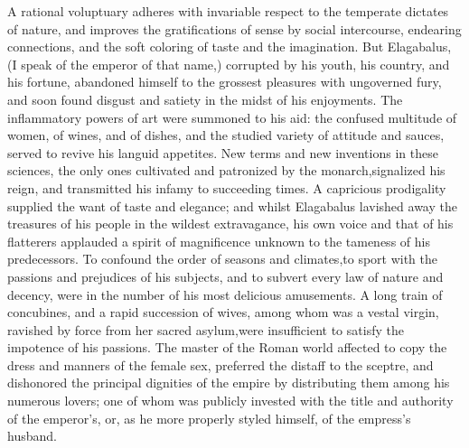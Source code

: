A rational voluptuary adheres with invariable respect to the
temperate dictates of nature, and improves the gratifications of
sense by social intercourse, endearing connections, and the soft
coloring of taste and the imagination. But Elagabalus, (I speak
of the emperor of that name,) corrupted by his youth, his
country, and his fortune, abandoned himself to the grossest
pleasures with ungoverned fury, and soon found disgust and
satiety in the midst of his enjoyments. The inflammatory powers
of art were summoned to his aid: the confused multitude of women,
of wines, and of dishes, and the studied variety of attitude and
sauces, served to revive his languid appetites. New terms and new
inventions in these sciences, the only ones cultivated and
patronized by the monarch,\footnotemark[56] signalized his reign, and
transmitted his infamy to succeeding times. A capricious
prodigality supplied the want of taste and elegance; and whilst
Elagabalus lavished away the treasures of his people in the
wildest extravagance, his own voice and that of his flatterers
applauded a spirit of magnificence unknown to the tameness of his
predecessors. To confound the order of seasons and climates,\footnotemark[57]
to sport with the passions and prejudices of his subjects, and to
subvert every law of nature and decency, were in the number of
his most delicious amusements. A long train of concubines, and a
rapid succession of wives, among whom was a vestal virgin,
ravished by force from her sacred asylum,\footnotemark[58] were insufficient to
satisfy the impotence of his passions. The master of the Roman
world affected to copy the dress and manners of the female sex,
preferred the distaff to the sceptre, and dishonored the
principal dignities of the empire by distributing them among his
numerous lovers; one of whom was publicly invested with the title
and authority of the emperor’s, or, as he more properly styled
himself, of the empress’s husband.\footnotemark[59]




